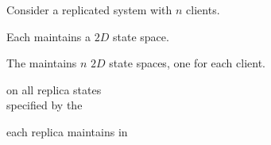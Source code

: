 \begin{frame}{}
  \centerline{\large Consider a replicated system with $n$ clients.}

\end{frame}

\begin{frame}{}
  \centerline{\large Each  maintains a $2D$ state space.}

\end{frame}

\begin{frame}{}
  \centerline{\large The  maintains $n$ $2D$ state spaces, one for each client.}

\end{frame}

\begin{frame}{}
  \begin{center}
    {\large {} on all replica states \\ specified by the }


    {\large {} each replica maintains in }
  \end{center}
\end{frame}
